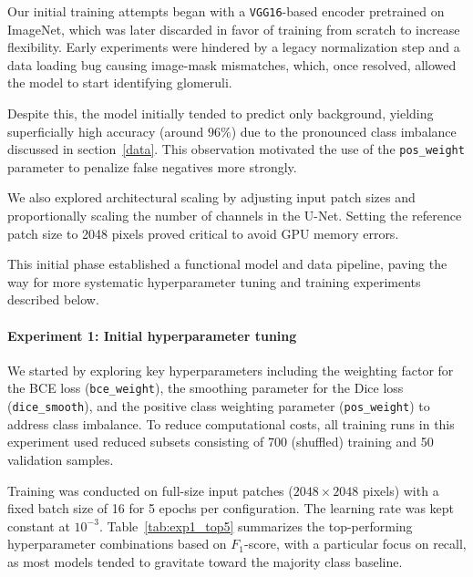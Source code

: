 \documentclass[12pt]{article}
\begin{document}
Our initial training attempts began with a \texttt{VGG16}-based encoder pretrained on ImageNet, which was later discarded in favor of training from scratch to increase flexibility. Early experiments were hindered by a legacy normalization step and a data loading bug causing image-mask mismatches, which, once resolved, allowed the model to start identifying glomeruli.

Despite this, the model initially tended to predict only background, yielding superficially high accuracy (around $96\%$) due to the pronounced class imbalance discussed in section~\ref{data}. This observation motivated the use of the \texttt{pos\_weight} parameter to penalize false negatives more strongly.

We also explored architectural scaling by adjusting input patch sizes and proportionally scaling the number of channels in the U-Net. Setting the reference patch size to 2048 pixels proved critical to avoid GPU memory errors.

This initial phase established a functional model and data pipeline, paving the way for more systematic hyperparameter tuning and training experiments described below.

\paragraph{Experiment 1: Initial hyperparameter tuning}  
We started by exploring key hyperparameters including the weighting factor for the BCE loss (\texttt{bce\_weight}), the smoothing parameter for the Dice loss (\texttt{dice\_smooth}), and the positive class weighting parameter (\texttt{pos\_weight}) to address class imbalance. To reduce computational costs, all training runs in this experiment used reduced subsets consisting of 700 (shuffled) training and 50 validation samples.  

Training was conducted on full-size input patches ($2048 \times 2048$ pixels) with a fixed batch size of 16 for 5 epochs per configuration. The learning rate was kept constant at $10^{-3}$. Table~\ref{tab:exp1_top5} summarizes the top-performing hyperparameter combinations based on $F_1$-score, with a particular focus on recall, as most models tended to gravitate toward the majority class baseline.
\end{document}
